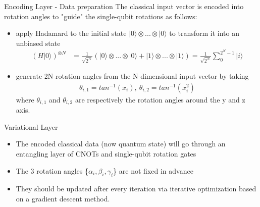 \begin{frame}{Encoding Layer - Data preparation}
	The \alert{classical} input vector is encoded into rotation angles to "guide" the single-qubit rotations as follows:
	\begin{itemize}
	\item<2-> 
		apply Hadamard to the initial state $|0\rangle \otimes ... \otimes |0 \rangle$ to transform it into an \alert{unbiased} state
		\begin{align*}
			(H | 0 \rangle)^{\otimes N} &= \frac{1}{\sqrt{2^N}} (|0\rangle \otimes ... \otimes |0\rangle + |1\rangle \otimes ... \otimes |1\rangle) 
				=  \frac{1}{\sqrt{2^N}} \sum^{2^N - 1}_0 |i\rangle
		\end{align*}
	  \item<3->
		generate 2N \alert{rotation} angles from the N-dimensional input vector by taking
		\begin{align*}
			\theta_{i,1} = tan^{-1}(x_i), \ \theta_{i,2} = tan^{-1} (x^2_i)
		\end{align*}
		where $\theta_{i,1}$ and $\theta_{i,2}$ are respectively the rotation angles around the y and z axis.
	\end{itemize}
\end{frame}

\begin{frame}{Variational Layer}
	\begin{itemize}
		\item The encoded classical data (now \alert{quantum state}) will go through an entangling layer of CNOTs and single-qubit rotation gates
		\item The 3 rotation angles \{$\alpha_i, \beta_i, \gamma_i$\} are not fixed in advance
		\item They should be updated after every iteration via iterative optimization based on a \alert{gradient descent method}.
	\end{itemize}
\end{frame}

